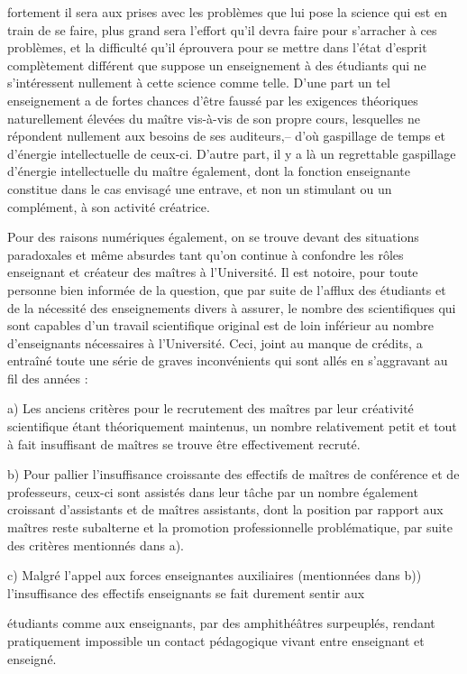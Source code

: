 \documentclass[11pt,a4paper]{article}
\begin{document}
fortement il sera aux prises avec les problèmes que lui pose la science qui
est en train de se faire, plus grand sera l'effort qu'il devra faire pour
s'arracher à ces problèmes, et la difficulté qu'il éprouvera pour se mettre
dans l'état d'esprit complètement différent que suppose un enseignement à
des étudiants qui ne s'intéressent nullement à cette science comme telle.
D'une part un tel enseignement a de fortes chances d'être faussé par les
exigences théoriques naturellement élevées du maître vis-à-vis de son propre
cours, lesquelles ne répondent nullement aux besoins de ses auditeurs,-- d'où
gaspillage de temps et d'énergie intellectuelle de ceux-ci. D'autre part, il
y a là un regrettable gaspillage d'énergie intellectuelle du maître également,
dont la fonction enseignante constitue dans le cas envisagé une entrave, et
non un stimulant ou un complément, à son activité créatrice.

Pour des raisons numériques également, on se trouve devant des
situations paradoxales et même absurdes tant qu'on continue à confondre
les rôles enseignant et créateur des maîtres à l'Université. Il est notoire,
pour toute personne bien informée de la question, que par suite de l'afflux
des étudiants et de la nécessité des enseignements divers à assurer, le
nombre des scientifiques qui sont capables d'un travail scientifique
original est de loin inférieur au nombre d'enseignants nécessaires à l'Université.
Ceci, joint au manque de crédits, a entraîné toute une série de graves
inconvénients qui sont allés en s'aggravant au fil des années :

a) Les anciens critères pour le recrutement des maîtres par leur
créativité scientifique étant théoriquement maintenus, un nombre
relativement petit et tout à fait insuffisant de maîtres se trouve être effectivement
recruté.

b) Pour pallier  l'insuffisance croissante des effectifs de
maîtres de conférence et de professeurs, ceux-ci sont assistés dans leur
tâche par un nombre également croissant d'assistants et de maîtres assistants,
dont la position par rapport aux maîtres reste subalterne et la promotion
professionnelle problématique, par suite des critères mentionnés dans a).

c) Malgré l'appel aux forces enseignantes auxiliaires (mentionnées
dans b)) l'insuffisance des effectifs enseignants se fait durement sentir aux

étudiants comme aux enseignants, par des amphithéâtres surpeuplés, rendant
pratiquement impossible un contact pédagogique vivant entre enseignant et
enseigné.
\end{document}

